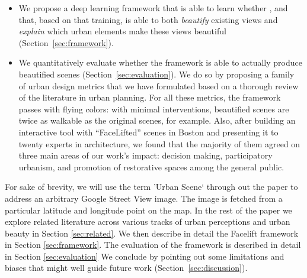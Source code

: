 \begin{itemize}
\item We propose a deep learning framework that is able to learn whether , and that, based on that training, is able to both \emph{beautify} existing views and \emph{explain} which urban elements  make these views beautiful (Section~\ref{sec:framework}). 

\item We quantitatively evaluate whether the framework is able to actually produce beautified scenes (Section~\ref{sec:evaluation}). We do so by proposing a family of  urban design metrics that we have formulated based on a thorough review of the literature in urban planning. For all these  metrics, the framework passes with flying colors: with minimal interventions, beautified scenes are twice as walkable as the original scenes, for example. Also, after building an interactive tool with ``FaceLifted'' scenes in Boston and presenting it to twenty experts in architecture,  we found that the majority of them agreed on three main areas of our work's impact: decision making, participatory urbanism, and promotion of restorative spaces among the general public. 

\end{itemize}
For sake of brevity, we will use the term 'Urban Scene` through out the paper to address an arbitrary Google Street View image. The image is fetched from a particular latitude and longitude point on the map. 
In the rest of the paper we explore related literature across various tracks of urban perceptions and urban beauty in Section \ref{sec:related}. We then describe in detail the Facelift framework in Section \ref{sec:framework}. The evaluation of the framework is described in detail in Section \ref{sec:evaluation} We conclude by pointing out some limitations and biases that might well guide future work (Section~\ref{sec:discussion}).




